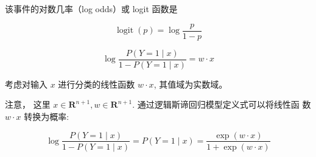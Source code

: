 该事件的对数几率（log odds）或 logit 函数是

\begin{equation} \operatorname{logit}(p)=\log \frac{p}{1-p} \end{equation}

\begin{equation} \log \frac{P(Y=1 \mid x)}{1-P(Y=1 \mid x)}=w \cdot x \end{equation}

考虑对输入 $ x $ 进行分类的线性函数 $ w \cdot x $, 其值域为实数域。

注意， 这里 $ x \in \mathbf{R}^{n+1}, w \in \mathbf{R}^{n+1} $. 通过逻辑斯谛回归模型定义式可以将线性函 数 $ w \cdot x $ 转换为概率:

\begin{equation}\log \frac{P(Y=1 \mid x)}{1-P(Y=1 \mid x)}= P(Y=1 \mid x)=\frac{\exp (w \cdot x)}{1+\exp (w \cdot x)} \end{equation}